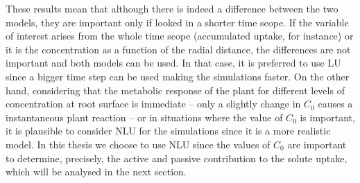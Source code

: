 




These results mean that although there is indeed a difference between the two models, they are important only if looked in a shorter time scope. 
If the variable of interest arises from the whole time scope (accumulated uptake, for instance) or it is the concentration as a function of the radial distance, the differences are not important and both models can be used. 
In that case, it is preferred to use LU since a bigger time step can be used making the simulations faster.
On the other hand, considering that the metabolic response of the plant for different levels of concentration at root surface is immediate -- only a slightly change in $C_0$ causes a instantaneous plant reaction -- or in situations where the value of $C_0$ is important, it is plausible to consider NLU for the simulations since it is a more realistic model.  
In this thesis we choose to use NLU since the values of $C_0$ are important to determine, precisely, the active and passive contribution to the solute uptake, which will be analysed in the next section.


